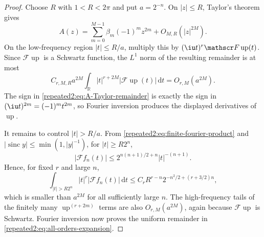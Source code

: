 \documentclass[11pt,oneside]{article}
\theoremstyle{definition}
\theoremstyle{remark}
\newcommand{\R}{\mathbb R}
\newcommand{\Up}{\operatorname{up}}
\newcommand{\sinc}{\operatorname{sinc}}
\newcommand{\dd}{\,\mathrm d}
\begin{document}
\begin{proof}
Choose $R$ with $1<R<2\pi$ and put $a=2^{-n}$.  On $|z|\le R$, Taylor's theorem gives
\begin{equation}
 A(z)=\sum_{m=0}^{M-1}\beta_m(-1)^m z^{2m}+O_{M,R}(|z|^{2M}).
 \label{repeated2:eq:A-Taylor-remainder}
\end{equation}
On the low-frequency region $|t|\le R/a$, multiply this by
$(\iu t)^r\mathscr F\Up(t)$.  Since $\mathscr F\Up$ is a Schwartz function, the
$L^1$ norm of the resulting remainder is at most
\[
 C_{r,M,R}a^{2M}\int_{\R}|t|^{r+2M}|\mathscr F\Up(t)|\dd t
 =O_{r,M}(a^{2M}).
\]
The sign in \eqref{repeated2:eq:A-Taylor-remainder} is exactly the sign in
$(\iu t)^{2m}=(-1)^mt^{2m}$, so Fourier inversion produces the displayed derivatives of
$\Up$.

It remains to control $|t|>R/a$.  From \eqref{repeated2:eq:finite-fourier-product} and
$|\sinc y|\le\min(1,|y|^{-1})$, for $|t|\ge R2^n$,
\begin{equation}
 |\mathscr F f_n(t)|
 \le 2^{n(n+1)/2+n}|t|^{-(n+1)}.
 \label{repeated2:eq:finite-product-high-frequency}
\end{equation}
Hence, for fixed $r$ and large $n$,
\[
 \int_{|t|>R2^n}|t|^r|\mathscr F f_n(t)|\dd t
 \le C_r R^{r-n}2^{-n^2/2+(r+3/2)n},
\]
which is smaller than $a^{2M}$ for all sufficiently large $n$.  The high-frequency tails
of the finitely many $\Up^{(r+2m)}$ terms are also $O_{r,M}(a^{2M})$, again because
$\mathscr F\Up$ is Schwartz.  Fourier inversion now proves the uniform remainder in
\eqref{repeated2:eq:all-orders-expansion}.
\end{proof}
\end{document}
